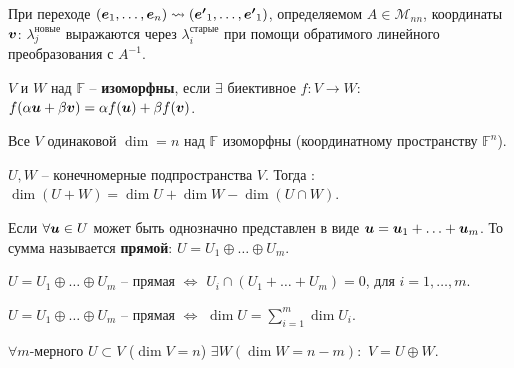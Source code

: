 \begin{to_thr}
	При переходе $(\mbox{\boldmath $e$}_1,\ldots,\mbox{\boldmath $e$}_n) \leadsto ( \mbox{\boldmath $e'$}_1,\ldots,\mbox{\boldmath $e'$}_1)$, определяемом $A \in \mathcal{M}_{n n}$, координаты $\mbox{\boldmath $v$}$: $\lambda_j^\text{новые}$ выражаются через $\lambda_i^\text{старые}$ при помощи обратимого линейного преобразования с $A^{-1}$.
	\label{transition_matrix}
\end{to_thr}

\begin{to_def}
	$V$ и $W$ над $\mathbb{F}$ -- \textbf{изоморфны}, если  $\exists$ биективное $f \colon V \to W:$ $f(\alpha \mbox{\boldmath $u$} + \beta \mbox{\boldmath $v$}) = \alpha f(\mbox{\boldmath $u$}) + \beta f(\mbox{\boldmath $v$})$.
\end{to_def}

\begin{to_thr}
	Все $V$ одинаковой $\dim = n$ над $\mathbb{F}$ изоморфны (координатному пространству $\mathbb{F}^n$).
\end{to_thr}

\begin{to_thr}
	$U, W$ -- конечномерные подпространства $V$. Тогда : $\dim(U + W) = \dim U + \dim W - \dim(U \cap W)$.
\end{to_thr}

\begin{to_def}
	Если $\forall \mbox{\boldmath $u$} \in U$ может быть однозначно представлен в виде $\mbox{\boldmath $u$} = \mbox{\boldmath $u$}_1 + \ldots + \mbox{\boldmath $u$}_m$. То сумма называется \textbf{прямой}: $U = U_1 \oplus \ldots \oplus U_m$.
\end{to_def}

\begin{to_thr}
	$U = U_1 \oplus \ldots \oplus U_m$ -- прямая $\Longleftrightarrow$ $U_i \cap (U_1 + \ldots + U_m) = 0$, для  $i=1, \ldots, m$.
\end{to_thr}

\begin{to_thr}
	$U = U_1 \oplus \ldots \oplus U_m$ -- прямая $\Longleftrightarrow$ $\dim U = \sum\limits_{ i=1 }^{ m } \dim U_i$.
\end{to_thr}

\begin{to_thr}
	$\forall m$-мерного $U \subset V$ ($\dim V = n$) $\exists W (\dim W = n-m):$ $V = U \oplus W$.
\end{to_thr}